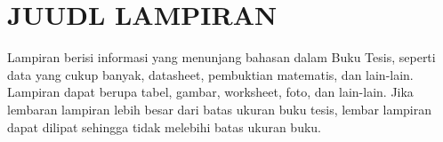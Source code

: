 \newpage
\chapter{JUUDL LAMPIRAN}
Lampiran berisi informasi yang menunjang bahasan dalam Buku Tesis, seperti data yang cukup banyak, datasheet, pembuktian matematis, dan lain-lain. Lampiran dapat berupa tabel, gambar, worksheet, foto, dan lain-lain. Jika lembaran lampiran lebih besar dari batas ukuran buku tesis, lembar lampiran dapat dilipat sehingga tidak melebihi batas ukuran buku.